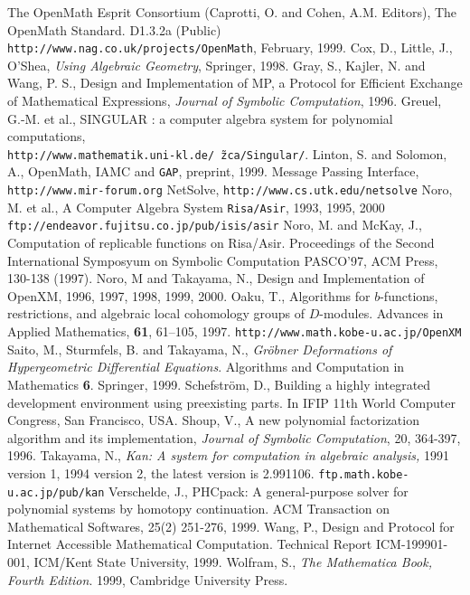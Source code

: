 
\begin{thebibliography}{X}
The OpenMath Esprit Consortium 
(Caprotti, O. and Cohen, A.M. Editors),
The OpenMath Standard. D1.3.2a (Public) \\
{\footnotesize \tt http://www.nag.co.uk/projects/OpenMath},
February, 1999.
Cox, D., Little, J.,  O'Shea,
{\it Using Algebraic Geometry}, Springer, 1998.
Gray, S., Kajler, N. and Wang, P. S.,
Design and Implementation of MP, a Protocol for Efficient
  Exchange of Mathematical Expressions,
{\sl Journal of Symbolic Computation}, 1996.
Greuel, G.-M. et al., SINGULAR : a computer algebra system for polynomial
computations, \\
{\tt http://www.mathematik.uni-kl.de/\~\,zca/Singular/}.
Linton, S. and Solomon, A.,
OpenMath, IAMC and {\tt GAP},
preprint, 1999.
 Message Passing Interface,
{\tt http://www.mir-forum.org} 
NetSolve, {\tt http://www.cs.utk.edu/netsolve}
Noro, M. et al., 
A Computer Algebra System {\tt Risa/Asir},  1993, 1995, 2000\\
{\tt ftp://endeavor.fujitsu.co.jp/pub/isis/asir}
Noro, M. and McKay, J.,
Computation of replicable functions on Risa/Asir.
Proceedings of the Second International Symposyum on
Symbolic Computation PASCO'97, ACM Press, 130-138 (1997).
Noro, M and Takayama, N., Design and Implementation
of OpenXM, 1996, 1997, 1998, 1999, 2000.
Oaku, T.,
Algorithms for $b$-functions, restrictions, and algebraic local cohomology
groups of $D$-modules.
Advances in Applied Mathematics, {\bf 61}, 61--105, 1997.
{\footnotesize {\tt http://www.math.kobe-u.ac.jp/OpenXM}}
Saito, M., Sturmfels, B. and Takayama, N.,
{\it Gr\"obner Deformations of Hypergeometric Differential Equations}.
Algorithms and Computation in Mathematics {\bf 6}. Springer, 1999.
Schefstr\"om, D.,
Building a highly integrated development environment using
preexisting parts.
In IFIP 11th World Computer Congress, San Francisco, USA.
Shoup, V., 
A new polynomial factorization algorithm and 
its implementation,
{\sl Journal of Symbolic Computation}, 20, 364-397, 1996.
	Takayama, N.,
	{\em Kan: A system for computation in
	algebraic analysis,} 1991 version 1,
        1994 version 2, the latest version is 2.991106. 
	{\tt \small ftp.math.kobe-u.ac.jp/pub/kan}
Verschelde, J.,
PHCpack: A general-purpose solver for polynomial systems by
homotopy continuation.  ACM Transaction on Mathematical Softwares, 25(2) 
251-276, 1999.
Wang, P.,
Design and Protocol for Internet Accessible Mathematical Computation.
Technical Report ICM-199901-001, ICM/Kent State University, 1999.
Wolfram, S.,
{\it The Mathematica Book, Fourth Edition}.
1999, Cambridge University Press.
\end{thebibliography}
